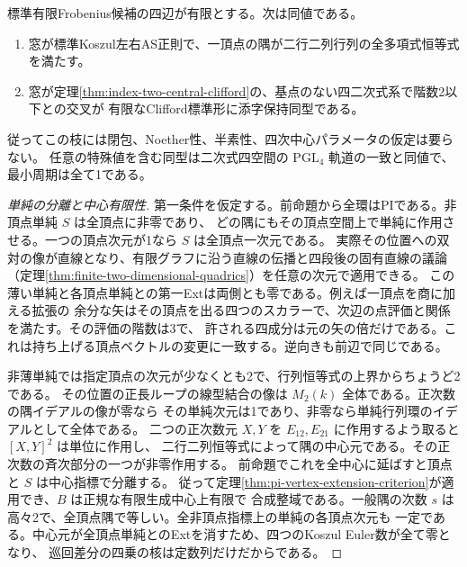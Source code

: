 \begin{theorem}\label{thm:one-corner-clifford-classification}
標準有限Frobenius候補の四辺が有限とする。次は同値である。
\begin{enumerate}
\item 窓が標準Koszul左右AS正則で、一頂点の隅が二行二列行列の全多項式恒等式を満たす。
\item 窓が定理\ref{thm:index-two-central-clifford}の、基点のない四二次式系で階数2以下との交叉が
有限なClifford標準形に添字保持同型である。
\end{enumerate}
従ってこの枝には閉包、Noether性、半素性、四次中心パラメータの仮定は要らない。
任意の特殊値を含む同型は二次式四空間の $\mathrm{PGL}_4$ 軌道の一致と同値で、最小周期は全て1である。
\end{theorem}
\begin{proof}[単純の分離と中心有限性]
第一条件を仮定する。前命題から全環はPIである。非頂点単純 $S$ は全頂点に非零であり、
どの隅にもその頂点空間上で単純に作用させる。一つの頂点次元が1なら $S$ は全頂点一次元である。
実際その位置への双対の像が直線となり、有限グラフに沿う直線の伝播と四段後の固有直線の議論
（定理\ref{thm:finite-two-dimensional-quadrics}）を任意の次元で適用できる。
この薄い単純と各頂点単純との第一Extは両側とも零である。例えば一頂点を商に加える拡張の
余分な矢はその頂点を出る四つのスカラーで、次辺の点評価と関係を満たす。その評価の階数は3で、
許される四成分は元の矢の倍だけである。これは持ち上げる頂点ベクトルの変更に一致する。逆向きも前辺で同じである。

非薄単純では指定頂点の次元が少なくとも2で、行列恒等式の上界からちょうど2である。
その位置の正長ループの線型結合の像は $M_2(k)$ 全体である。正次数の隅イデアルの像が零なら
その単純次元は1であり、非零なら単純行列環のイデアルとして全体である。
二つの正次数元 $X,Y$ を $E_{12},E_{21}$ に作用するよう取ると $[X,Y]^2$ は単位に作用し、
二行二列恒等式によって隅の中心元である。その正次数の斉次部分の一つが非零作用する。
前命題でこれを全中心に延ばすと頂点と $S$ は中心指標で分離する。
従って定理\ref{thm:pi-vertex-extension-criterion}が適用でき、$B$ は正規な有限生成中心上有限で
合成整域である。一般隅の次数 $s$ は高々2で、全頂点隅で等しい。全非頂点指標上の単純の各頂点次元も
一定である。中心元が全頂点単純とのExtを消すため、四つのKoszul Euler数が全て零となり、
巡回差分の四乗の核は定数列だけだからである。
\end{proof}

